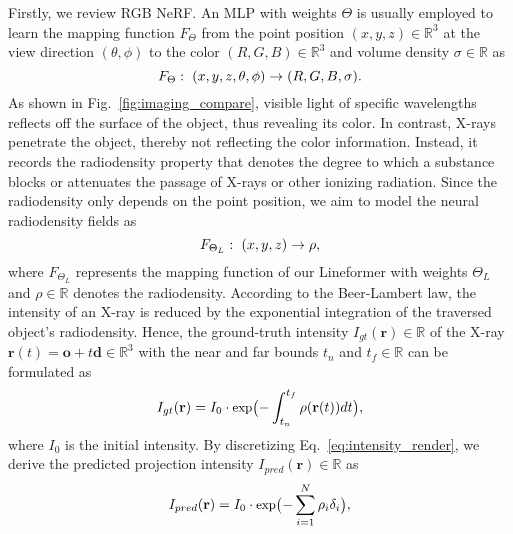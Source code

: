 \documentclass[10pt,twocolumn,letterpaper]{article}
\begin{document}
Firstly, we review RGB NeRF. An MLP with weights $\Theta$ is usually employed to learn the mapping function $F_{\Theta}$ from the point position $(x, y, z) \in \mathbb{R}^3$ at the view direction $(\theta, \phi)$  to the color $(R, G, B) \in \mathbb{R}^3$ and volume density $\sigma \in \mathbb{R}$ as
\vspace{-0.7mm}
\begin{equation}
\small
F_{\Theta}: ~(x, y, z, \theta, \phi) \rightarrow (R, G, B, \sigma).
\vspace{-0.7mm}
\end{equation}
As shown in Fig.~\ref{fig:imaging_compare}, visible light of specific wavelengths reflects off the surface of the object, thus revealing its color. In contrast, X-rays penetrate the object, thereby not reflecting the color information. Instead, it records the radiodensity property that denotes the degree to which a substance blocks or attenuates the passage of X-rays or other ionizing radiation. Since the radiodensity only depends on the point position, we aim to model the neural radiodensity fields as
\vspace{-1.1mm}
\begin{equation}
\small
F_{\Theta_L}: ~(x, y, z) \rightarrow  \rho,
\vspace{-1.1mm}
\label{eq:radiodensity_field}
\end{equation}
where $F_{\Theta_L}$ represents the mapping function of our Lineformer with weights $\Theta_L$ and $\rho \in \mathbb{R}$ denotes the radiodensity. According to the Beer-Lambert law, the intensity of an X-ray is reduced by the exponential integration of the traversed object's radiodensity. Hence, the ground-truth intensity $I_{gt}\mathbf{(r)} \in \mathbb{R}$  of the X-ray $\mathbf{r}(t) = \mathbf{o} + t \mathbf{d} \in \mathbb{R}^3$ with the near and far bounds $t_n$ and $t_f \in \mathbb{R}$ can be formulated as
\vspace{-0.7mm}
\begin{equation}
\small
I_{gt}\mathbf{(r)} = {I}_0 \cdot \text{exp}\big({-\int_{t_n}^{t_f}\rho(\mathbf{r}(t)) dt}\big),
\vspace{1.3mm}
\label{eq:intensity_render}
\end{equation}
where $I_0$ is the initial intensity. By discretizing Eq.~\eqref{eq:intensity_render}, we derive the predicted projection intensity $I_{pred}(\mathbf{r}) \in \mathbb{R}$ as
\vspace{-0.3mm}
\begin{equation}
\small
{I}_{pred}(\mathbf{r}) = {I}_0 \cdot \text{exp}\big({-\sum_{i=1}^{N} \rho_i \delta_i}\big),
\label{eq:intensity_render_discrete}
\vspace{-0.2mm}
\end{equation}
\end{document}
